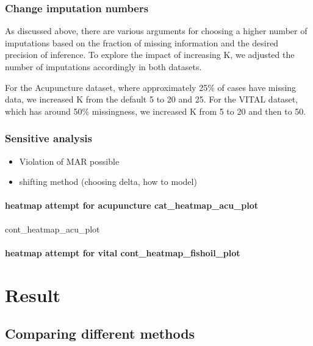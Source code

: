 \documentclass{article}
\providecommand{\tightlist}{%
  \setlength{\itemsep}{0pt}\setlength{\parskip}{0pt}}
\begin{document}
\subsubsection{Change imputation
numbers}\label{change-imputation-numbers}

As discussed above, there are various arguments for choosing a higher
number of imputations based on the fraction of missing information and
the desired precision of inference. To explore the impact of increasing
K, we adjusted the number of imputations accordingly in both datasets.

For the Acupuncture dataset, where approximately 25\% of cases have
missing data, we increased K from the default 5 to 20 and 25. For the
VITAL dataset, which has around 50\% missingness, we increased K from 5
to 20 and then to 50.

\subsubsection{Sensitive analysis}\label{sensitive-analysis}

\begin{itemize}
\tightlist
\item
  Violation of MAR possible
\item
  shifting method (choosing delta, how to model)
\end{itemize}

\paragraph{heatmap attempt for acupuncture
cat\_heatmap\_acu\_plot}\label{heatmap-attempt-for-acupuncture-cat_heatmap_acu_plot}

cont\_heatmap\_acu\_plot

\paragraph{heatmap attempt for vital
cont\_heatmap\_fishoil\_plot}\label{heatmap-attempt-for-vital-cont_heatmap_fishoil_plot}

\section{Result}\label{result}

\subsection{Comparing different
methods}\label{comparing-different-methods}
\end{document}
